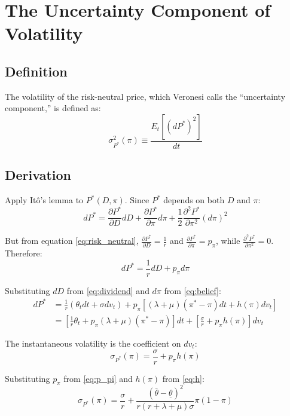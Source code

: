 \documentclass[12pt]{article}
\begin{document}
\section{The Uncertainty Component of Volatility}

\subsection{Definition}

The volatility of the risk-neutral price, which Veronesi calls the ``uncertainty component,'' is defined as:
\begin{equation}
\sigma_{P^*}^2(\pi) \equiv \frac{E_t[(dP^*)^2]}{dt}
\end{equation}

\subsection{Derivation}

Apply Itô's lemma to $P^*(D, \pi)$. Since $P^*$ depends on both $D$ and $\pi$:
\begin{equation}
dP^* = \frac{\partial P^*}{\partial D}dD + \frac{\partial P^*}{\partial \pi}d\pi + \frac{1}{2}\frac{\partial^2 P^*}{\partial \pi^2}(d\pi)^2
\end{equation}

But from equation \eqref{eq:risk_neutral}, $\frac{\partial P^*}{\partial D} = \frac{1}{r}$ and $\frac{\partial P^*}{\partial \pi} = p_\pi$, while $\frac{\partial^2 P^*}{\partial \pi^2} = 0$. Therefore:
\begin{equation}
dP^* = \frac{1}{r}dD + p_\pi d\pi
\end{equation}

Substituting $dD$ from \eqref{eq:dividend} and $d\pi$ from \eqref{eq:belief}:
\begin{align}
dP^* &= \frac{1}{r}(\theta_t dt + \sigma dv_t) + p_\pi\left[(\lambda+\mu)(\pi^*-\pi)dt + h(\pi)dv_t\right] \\
&= \left[\frac{1}{r}\theta_t + p_\pi(\lambda+\mu)(\pi^*-\pi)\right]dt + \left[\frac{\sigma}{r} + p_\pi h(\pi)\right]dv_t
\end{align}

The instantaneous volatility is the coefficient on $dv_t$:
\begin{equation}
\sigma_{P^*}(\pi) = \frac{\sigma}{r} + p_\pi h(\pi) \label{eq:vol_uncertainty}
\end{equation}

Substituting $p_\pi$ from \eqref{eq:p_pi} and $h(\pi)$ from \eqref{eq:h}:
\begin{equation}
\boxed{\sigma_{P^*}(\pi) = \frac{\sigma}{r} + \frac{(\bar{\theta} - \underline{\theta})^2}{r(r + \lambda + \mu)\sigma} \pi(1-\pi)} \label{eq:vol_final}
\end{equation}
\end{document}
